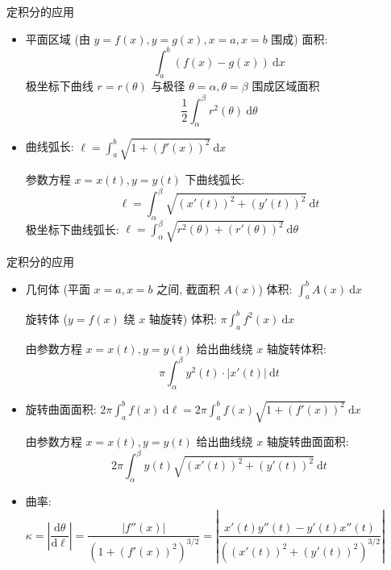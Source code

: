 
\begin{frame}{定积分的应用}

\begin{itemize}
\item 平面区域 (由 $y=f(x), y=g(x), x = a, x = b$ 围成) 面积:
\[\int_a^b (f(x) - g(x)) ~ \mathrm{d}x\]
\pause
极坐标下曲线 $r = r(\theta)$ 与极径 $\theta = \alpha, \theta = \beta$ 围成区域面积
\[\dfrac{1}{2} \int_{\alpha}^{\beta} r^2(\theta) ~ \mathrm{d} \theta\]
\pause
\item 曲线弧长: $\ell = \int_a^b \sqrt{1 + (f'(x))^2} ~ \mathrm{d} x$ \par
\pause
参数方程 $x = x(t), y = y(t)$ 下曲线弧长:
\[\ell = \int_{\alpha}^{\beta} \sqrt{(x'(t))^2 + (y'(t))^2} ~ \mathrm{d} t\]
\pause
极坐标下曲线弧长: $\ell = \int_{\alpha}^{\beta} \sqrt{r^2(\theta) + (r'(\theta))^2} ~ \mathrm{d} \theta$
\end{itemize}

\end{frame}


\begin{frame}{定积分的应用}

\begin{itemize}
\item 几何体 (平面 $x = a, x = b$ 之间, 截面积 $A(x)$) 体积: $\int_a^b A(x) ~ \mathrm{d} x$ \par
\pause
旋转体 ($y = f(x)$ 绕 $x$ 轴旋转) 体积: $\pi \int_a^b f^2(x) ~ \mathrm{d} x$ \par
\pause
由参数方程 $x = x(t), y = y(t)$ 给出曲线绕 $x$ 轴旋转体积:
\[\pi \int_{\alpha}^{\beta} y^2(t) \cdot \lvert x'(t) \rvert ~ \mathrm{d} t\]
\pause
\vspace{-1em}
\item 旋转曲面面积: $2\pi \int_a^b f(x) ~ \mathrm{d} \ell = 2\pi \int_a^b f(x) \sqrt{1 + (f'(x))^2} ~ \mathrm{d} x$ \par
\pause
由参数方程 $x = x(t), y = y(t)$ 给出曲线绕 $x$ 轴旋转曲面面积:
\[2\pi \int_{\alpha}^{\beta} y(t) \sqrt{(x'(t))^2 + (y'(t))^2} ~ \mathrm{d} t\]
\pause
\vspace{-1em}
\item 曲率: $\kappa = \left\lvert \dfrac{\mathrm{d} \theta}{\mathrm{d} \ell} \right\rvert = \dfrac{\lvert f''(x) \rvert}{(1 + (f'(x))^2)^{3/2}} = \left\lvert \dfrac{x'(t)y''(t) - y'(t)x''(t)}{((x'(t))^2 + (y'(t))^2)^{3/2}} \right\rvert$
\end{itemize}

\end{frame}

